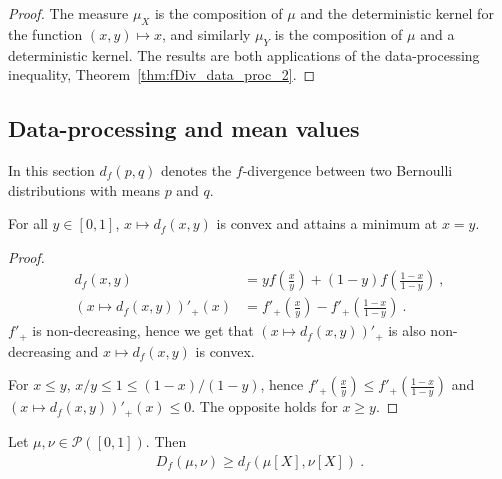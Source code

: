 \begin{proof}\leanok
{}
The measure $\mu_X$ is the composition of $\mu$ and the deterministic kernel for the function $(x,y) \mapsto x$, and similarly $\mu_Y$ is the composition of $\mu$ and a deterministic kernel.
The results are both applications of the data-processing inequality, Theorem~\ref{thm:fDiv_data_proc_2}.
\end{proof}




\subsection{Data-processing and mean values}

In this section $d_f(p, q)$ denotes the $f$-divergence between two Bernoulli distributions with means $p$ and $q$.


\begin{lemma}
  \label{lem:fDiv_bernoulli_convex}
  For all $y \in [0,1]$, $x \mapsto d_f(x, y)$ is convex and attains a minimum at $x = y$.
\end{lemma}

\begin{proof}%
\uses{}

\begin{align*}
d_f(x, y)
&= y f(\frac{x}{y}) + (1 - y) f(\frac{1 - x}{1 - y})
\: , \\
(x \mapsto d_f(x, y))'_+(x)
&= f'_+(\frac{x}{y}) - f'_+(\frac{1 - x}{1 - y})
\: .
\end{align*}
$f'_+$ is non-decreasing, hence we get that $(x \mapsto d_f(x, y))'_+$ is also non-decreasing and $x \mapsto d_f(x, y)$ is convex.

For $x \le y$, $x/y \le 1 \le (1-x)/(1-y)$, hence $f'_+(\frac{x}{y}) \le f'_+(\frac{1 - x}{1 - y})$ and $(x \mapsto d_f(x, y))'_+(x) \le 0$. The opposite holds for $x \ge y$.

\end{proof}


\begin{lemma}
  \label{lem:fDiv_bounded_ge_fDiv_mean}
  Let $\mu, \nu \in \mathcal P([0,1])$. Then
  \begin{align*}
  D_f(\mu, \nu) \ge d_f(\mu[X], \nu[X]) \: .
  \end{align*}
\end{lemma}

